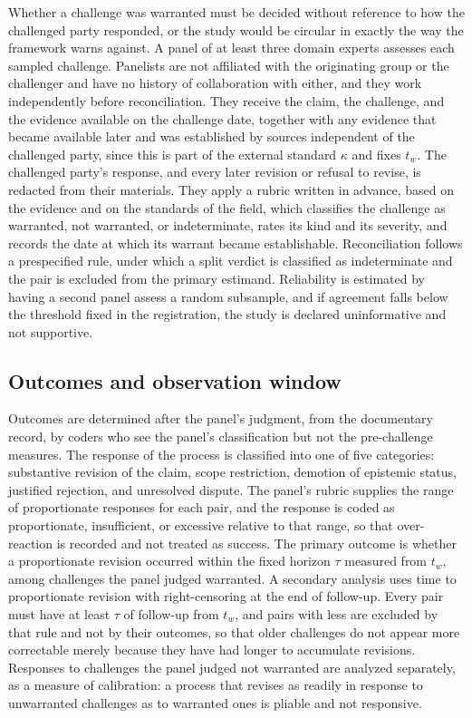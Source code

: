 \documentclass[11pt]{article}
\theoremstyle{remark}
\begin{document}
Whether a challenge was warranted must be decided without reference to how the challenged party responded, or the study would be circular in exactly the way the framework warns against. A panel of at least three domain experts assesses each sampled challenge. Panelists are not affiliated with the originating group or the challenger and have no history of collaboration with either, and they work independently before reconciliation. They receive the claim, the challenge, and the evidence available on the challenge date, together with any evidence that became available later and was established by sources independent of the challenged party, since this is part of the external standard $\kappa$ and fixes $t_w$. The challenged party's response, and every later revision or refusal to revise, is redacted from their materials. They apply a rubric written in advance, based on the evidence and on the standards of the field, which classifies the challenge as warranted, not warranted, or indeterminate, rates its kind and its severity, and records the date at which its warrant became establishable. Reconciliation follows a prespecified rule, under which a split verdict is classified as indeterminate and the pair is excluded from the primary estimand. Reliability is estimated by having a second panel assess a random subsample, and if agreement falls below the threshold fixed in the registration, the study is declared uninformative and not supportive.

\subsection{Outcomes and observation window}

Outcomes are determined after the panel's judgment, from the documentary record, by coders who see the panel's classification but not the pre-challenge measures. The response of the process is classified into one of five categories: substantive revision of the claim, scope restriction, demotion of epistemic status, justified rejection, and unresolved dispute. The panel's rubric supplies the range of proportionate responses for each pair, and the response is coded as proportionate, insufficient, or excessive relative to that range, so that over-reaction is recorded and not treated as success. The primary outcome is whether a proportionate revision occurred within the fixed horizon $\tau$ measured from $t_w$, among challenges the panel judged warranted. A secondary analysis uses time to proportionate revision with right-censoring at the end of follow-up. Every pair must have at least $\tau$ of follow-up from $t_w$, and pairs with less are excluded by that rule and not by their outcomes, so that older challenges do not appear more correctable merely because they have had longer to accumulate revisions. Responses to challenges the panel judged not warranted are analyzed separately, as a measure of calibration: a process that revises as readily in response to unwarranted challenges as to warranted ones is pliable and not responsive.
\end{document}
